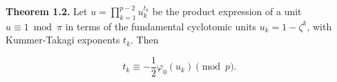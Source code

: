 \textbf{Theorem 1.2.} Let $u = \prod_{k=1}^{p-2} u_k^{t_k}$ be the product expression of a unit $u \equiv 1 \bmod \pi$ in terms of the fundamental cyclotomic units $u_k = 1 - \zeta^k$, with Kummer-Takagi exponents $t_k$. Then

$$t_k \equiv -\frac{1}{2} \varphi_0(u_k) \pmod{p}.$$
